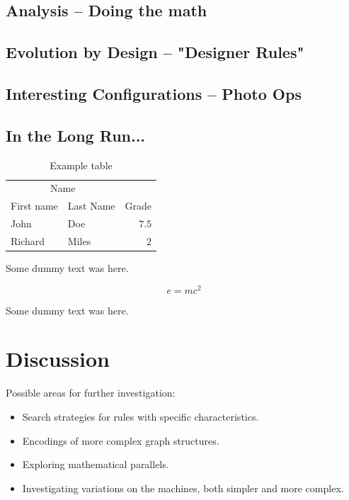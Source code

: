 \documentclass[twoside,twocolumn]{article}
\begin{document}
\subsection{Analysis -- Doing the math}

\subsection{Evolution by Design -- "Designer Rules"}

\subsection{Interesting Configurations -- Photo Ops}

\subsection{In the Long Run...}

\begin{table}
\caption{Example table}
\centering
\begin{tabular}{llr}
\toprule
\multicolumn{2}{c}{Name} \\
\cmidrule(r){1-2}
First name & Last Name & Grade \\
\midrule
John & Doe & $7.5$ \\
Richard & Miles & $2$ \\
\bottomrule
\end{tabular}
\end{table}

Some dummy text was here.

\begin{equation}
\label{eq:emc}
e = mc^2
\end{equation}

Some dummy text was here.


\section{Discussion}

Possible areas for further investigation:

\begin{itemize}
    \item Search strategies for rules with specific characteristics.
    \item Encodings of more complex graph structures.
    \item Exploring mathematical parallels.
    \item Investigating variations on the machines, both simpler and more complex.
\end{itemize}
\end{document}
